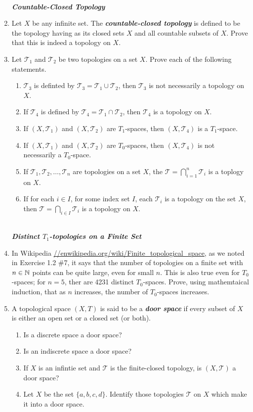 \documentclass[10pt,a4paper]{report}
\newcommand{\SPECIAL}[1]{\begin{center}
	{\Large \textbf{\textit{\\#1}} }
\end{center}
}
\newcommand{\TT}{\mathcal{T}}
\begin{document}
\begin{enumerate}
	\SPECIAL{Countable-Closed Topology}

\item Let $X$ be any infinite set.  The \textbf{\textit{countable-closed topology}} is defined to be the topology having as its closed sets $X$ and all countable subsets of $X$.  Prove that this is indeed a topology on $X$.

\item Let $\TT_1$ and $\TT_2$ be two topologies on a set $X$.  Prove each of the following statements.
\begin{enumerate}[label=(\roman*)]
	\item $\TT_3$ is definted by $\TT_3 = \TT_1 \cup \TT_2$, then $\TT_3$ is not necessarily a topology on $X$. 
	\item If $\TT_4$ is defined by $\TT_4 = \TT_1 \cap \TT_2$, then $\TT_4$ is a topology on $X$.
	\item If $(X,\TT_1)$ and $(X,\TT_2)$ are $T_1$-spaces, then $(X,\TT_4)$ is a $T_1$-space.
	\item If $(X,\TT_1)$ and $(X,\TT_2)$ are $T_0$-spaces, then $(X,\TT_4)$ is not necessarily a $T_0$-space.
	\item If $\TT_1, \TT_2, \dots, \TT_n$ are topologies on a set $X$, the $\TT = \bigcap_{i=1}^n \TT_i$ is a toplogy on $X$.
	\item If for each $i \in I$, for some index set $I$, each $\TT_i$ is a topology on the set $X$, then $\TT = \bigcap_{i\in I} \TT_i$ is a topology on $X$.
\end{enumerate}

\SPECIAL{Distinct $T_1$-topologies on a Finite Set}

\item In Wikipedia \url{//enwikipedia.org/wiki/Finite_topological_space}, as we noted in Exercise 1.2 \#7, it says that the number of topologies on a finite set with $n \in \mathbb{N}$ points can be quite large, even for small $n$.  This is also true even for $T_0$-spaces; for $n=5$, ther are 4231 distinct $T_0$-spaces.  Prove, using mathemtaical induction, that as $n$ increases, the number of $T_0$-spaces increases.

\item A topological space $(X,T)$ is said to be a \textbf{\textit{door space}} if every subset of $X$ is either an open set or a closed set (or both).
\begin{enumerate}[label=(\roman*)]
	\item Is a discrete space a door space?
	\item Is an indiscrete space a door space?
	\item If $X$ is an infintie set and $\TT$ is the finite-closed topology, is $(X,\TT)$ a door space?
	\item Let $X$ be the set $\{a,b,c,d\}$.  Identify those topologies $\TT$ on $X$ which make it into a door space.
\end{enumerate}


\end{enumerate}
\end{document}
